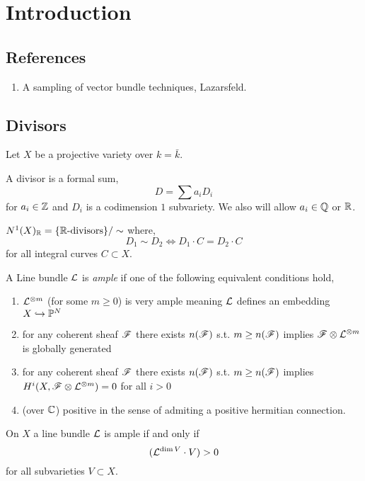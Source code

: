 \documentclass[12pt]{article}
\begin{document}
\section{Introduction}

\subsection{References}

\begin{enumerate}
\item A sampling of vector bundle techniques, Lazarsfeld. 
\end{enumerate}

\subsection{Divisors}

\begin{rmk}
Let $X$ be a projective variety over $k = \bar{k}$.
\end{rmk}

A divisor is a formal sum,
\[ D = \sum a_i D_i \]
for $a_i \in \mathbb{Z}$ and $D_i$ is a codimension $1$ subvariety. We also will allow $a_i \in \mathbb{Q}$ or $\mathbb{R}$. 

\begin{defn}
$N^1(X)_{\mathbb{R}} = \{ \mathbb{R}\text{-divisors} \} / \sim$ 
where,
\[ D_1 \sim D_2 \iff D_1 \cdot C = D_2 \cdot C \]
for all integral curves $C \subset X$. 
\end{defn}

\begin{defn}[Ample]
A Line bundle $\mathcal{L}$ is \textit{ample} if one of the following equivalent conditions hold,
\begin{enumerate}
\item $\mathcal{L}^{\otimes m}$ (for some $m \ge 0$) is very ample meaning $\mathcal{L}$ defines an embedding $X \hookrightarrow \mathbb{P}^N$
\item for any coherent sheaf $\mathscr{F}$ there exists $n(\mathscr{F})$ s.t. $m \ge n(\mathscr{F})$ implies $\mathscr{F} \otimes \mathcal{L}^{\otimes m}$ is globally generated
\item for any coherent sheaf $\mathscr{F}$ there exists $n(\mathscr{F})$ s.t. $m \ge n(\mathscr{F})$ implies $H^i(X, \mathscr{F} \otimes \mathcal{L}^{\otimes m}) = 0$ for all $i > 0$
\item (over $\mathbb{C}$) positive in the sense of admiting a positive hermitian connection.
\end{enumerate}
\end{defn}

\begin{theorem}
On $X$ a line bundle $\mathcal{L}$ is ample if and only if
\[ (\mathcal{L}^{\dim{V}} \cdot V) > 0 \]
for all subvarieties $V \subset X$.
\end{theorem}
\end{document}
